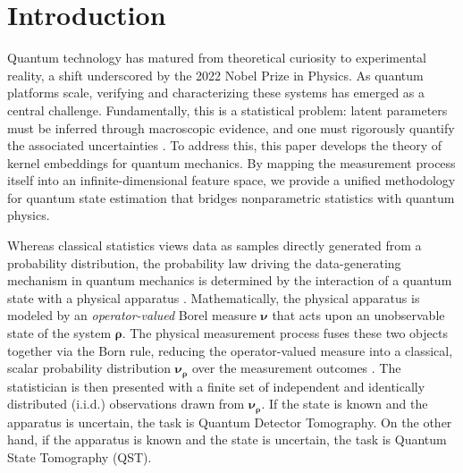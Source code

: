 \documentclass[noinfoline]{imsart}\setcounter{tocdepth}{2}
\newcommand{\mb}[1]{\boldsymbol{#1}} %
\theoremstyle{plain}
\begin{document}
\begin{frontmatter}
\begin{keyword}[class=MSC]
\end{keyword}

\begin{keyword}
\end{keyword}
\end{frontmatter}

\maketitle

\section{Introduction}
Quantum technology has matured from theoretical curiosity to experimental reality, a shift underscored by the 2022 Nobel Prize in Physics. As quantum platforms scale, verifying and characterizing these systems has emerged as a central challenge. Fundamentally, this is a statistical problem: latent parameters must be inferred through macroscopic evidence, and one must rigorously quantify the associated uncertainties \cite{d2002quantum, christandl2012reliable, cramer2010efficient}. To address this, this paper develops the theory of kernel embeddings for quantum mechanics. By mapping the measurement process itself into an infinite-dimensional feature space, we provide a unified methodology for quantum state estimation that bridges nonparametric statistics with quantum physics.


Whereas classical statistics views data as samples directly generated from a probability distribution, the probability law driving the data-generating mechanism in quantum mechanics is determined by the interaction of a quantum state with a physical apparatus \cite{holevo2011probabilistic,cohen2019quantum,nielsen2010quantum}. Mathematically, the physical apparatus is modeled by an \emph{operator-valued} Borel measure $\mb{\nu}$ that acts upon an unobservable state of the system $\mb{\rho}$. The physical measurement process fuses these two objects together via the Born rule, reducing the operator-valued measure into a classical, scalar probability distribution $\mb{\nu}_{\mb{\rho}}$ over the measurement outcomes \cite{hall2013quantum,talagrand2022quantum}. The statistician is then presented with a finite set of independent and identically distributed (i.i.d.) observations drawn from $\mb{\nu}_{\mb{\rho}}$. If the state is known and the apparatus is uncertain, the task is Quantum Detector Tomography. On the other hand, if the apparatus is known and the state is uncertain, the task is Quantum State Tomography (QST).
\end{document}
